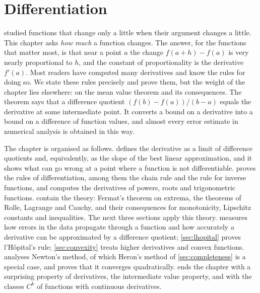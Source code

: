 \chapter{Differentiation}
\label{ch:differentiation}


 studied functions that change only a little when their argument changes a little. This chapter asks \emph{how much} a function changes. The answer, for the functions that matter most, is that near a point $a$ the change $f(a+h)-f(a)$ is very nearly proportional to $h$, and the constant of proportionality is the derivative $f'(a)$. Most readers have computed many derivatives and know the rules for doing so. We state these rules precisely and prove them, but the weight of the chapter lies elsewhere: on the mean value theorem and its consequences. The theorem says that a difference quotient $(f(b)-f(a))/(b-a)$ equals the derivative at some intermediate point. It converts a bound on a derivative into a bound on a difference of function values, and almost every error estimate in numerical analysis is obtained in this way.

The chapter is organised as follows.  defines the derivative as a limit of difference quotients and, equivalently, as the slope of the best linear approximation, and it shows what can go wrong at a point where a function is not differentiable.  proves the rules of differentiation, among them the chain rule and the rule for inverse functions, and computes the derivatives of powers, roots and trigonometric functions.  contain the theory: Fermat's theorem on extrema, the theorems of Rolle, Lagrange and Cauchy, and their consequences for monotonicity, Lipschitz constants and inequalities. The next three sections apply this theory.  measures how errors in the data propagate through a function and how accurately a derivative can be approximated by a difference quotient; \cref{sec:lhopital} proves l'H\^opital's rule; \cref{sec:convexity} treats higher derivatives and convex functions.  analyses Newton's method, of which Heron's method of \cref{sec:completeness} is a special case, and proves that it converges quadratically.  ends the chapter with a surprising property of derivatives, the intermediate value property, and with the classes $C^k$ of functions with continuous derivatives.

